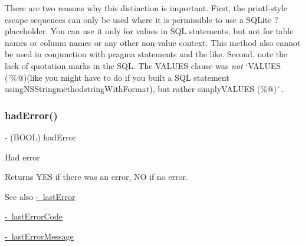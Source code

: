There are two reasons why this distinction is important. First, the printf-\/style escape sequences can only be used where it is permissible to use a S\+Q\+Lite {\ttfamily ?} placeholder. You can use it only for values in S\+QL statements, but not for table names or column names or any other non-\/value context. This method also cannot be used in conjunction with {\ttfamily pragma} statements and the like. Second, note the lack of quotation marks in the S\+QL. The {\ttfamily V\+A\+L\+U\+ES} clause was {\itshape not} `V\+A\+L\+U\+ES ('\%@\textquotesingle{}){\ttfamily (like you might have to do if you built a S\+QL statement using}N\+S\+String{\ttfamily method}string\+With\+Format{\ttfamily ), but rather simply}V\+A\+L\+U\+ES (\%@)\`{}. \mbox{\label{interface_o_p_t_l_y_f_m_d_b_database_afc9d747532c96f0f2afb78dd84caee87}} 
\subsubsection{\texorpdfstring{had\+Error()}{hadError()}}
{\footnotesize\ttfamily -\/ (B\+O\+OL) had\+Error \begin{DoxyParamCaption}{ }\end{DoxyParamCaption}}

Had error

\begin{DoxyReturn}{Returns}
{\ttfamily Y\+ES} if there was an error, {\ttfamily NO} if no error.
\end{DoxyReturn}
\begin{DoxySeeAlso}{See also}
\mbox{\hyperlink{interface_o_p_t_l_y_f_m_d_b_database_a477a6ff4d9daaac53a56c0a058a0d2f7}{-\/ last\+Error}} 

\mbox{\hyperlink{interface_o_p_t_l_y_f_m_d_b_database_a9f15cf87d3c764783ce0c6beb39393a9}{-\/ last\+Error\+Code}} 

\mbox{\hyperlink{interface_o_p_t_l_y_f_m_d_b_database_a082c5d58576df07956308656064e1f63}{-\/ last\+Error\+Message}} 
\end{DoxySeeAlso}
\mbox{\label{interface_o_p_t_l_y_f_m_d_b_database_a820a1ababb4c5496800b9bcd5f2de784}} 
